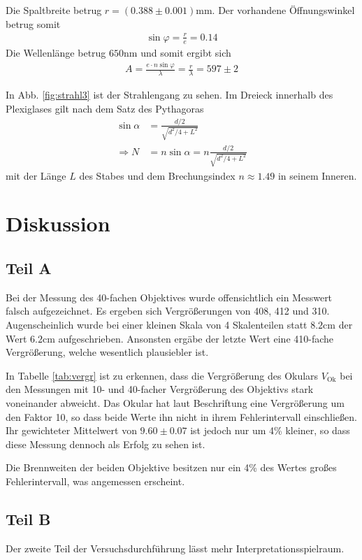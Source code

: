 \documentclass[12pt,a4paper,titlepage,headinclude,bibtotoc]{scrartcl}
\begin{document}
Die Spaltbreite betrug $r=(0.388\pm0.001)\si{\milli\metre}$.
Der vorhandene Öffnungswinkel betrug somit
\begin{align*}
\sin\varphi=\frac{r}{e}=0.14
\end{align*}
Die Wellenlänge betrug $650\si{\nano\metre}$ und somit ergibt sich
\begin{align*}
A=\frac{e\cdot n\sin\varphi}{\lambda}=\frac{r}{\lambda}=597 \pm 2
\end{align*}

In Abb. \ref{fig:strahl3} ist der Strahlengang zu sehen.
Im Dreieck innerhalb des Plexiglases gilt nach dem Satz des Pythagoras
\begin{align}
\sin\alpha&=\frac{d/2}{\sqrt{d^2/4+L^2}}\\
\Rightarrow N&=n\sin\alpha=n\frac{d/2}{\sqrt{d^2/4+L^2}}
\end{align}
mit der Länge $L$ des Stabes und dem Brechungsindex $n\approx1.49$ in seinem Inneren.

\section{Diskussion}
\label{sec:diskussion}
\subsection{Teil A}
Bei der Messung des 40-fachen Objektives wurde offensichtlich ein Messwert falsch aufgezeichnet.
Es ergeben sich Vergrößerungen von 408, 412 und 310.
Augenscheinlich wurde bei einer kleinen Skala von 4 Skalenteilen statt $8.2\si{\centi\metre}$ der Wert $6.2\si{\centi\metre}$ aufgeschrieben.
Ansonsten ergäbe der letzte Wert eine 410-fache Vergrößerung, welche wesentlich plausiebler ist.

In Tabelle \ref{tab:vergr} ist zu erkennen, dass die Vergrößerung des Okulars $V_\text{Ok}$ bei den Messungen mit 10- und 40-facher Vergrößerung des Objektivs stark voneinander abweicht.
Das Okular hat laut Beschriftung eine Vergrößerung um den Faktor 10, so dass beide Werte ihn nicht in ihrem Fehlerintervall einschließen.
Ihr gewichteter Mittelwert von $9.60\pm0.07$ ist jedoch nur um 4\% kleiner, so dass diese Messung dennoch als Erfolg zu sehen ist.

Die Brennweiten der beiden Objektive besitzen nur ein 4\% des Wertes großes Fehlerintervall, was angemessen erscheint.


\subsection{Teil B}
Der zweite Teil der Versuchsdurchführung lässt mehr Interpretationsspielraum.
\end{document}
